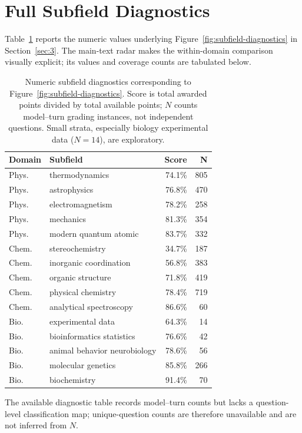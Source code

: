 \documentclass[11pt]{article}
\begin{document}
\section{Full Subfield Diagnostics}
\label{app:subfield_table}
Table~\ref{tab:subfield-diagnostics-full} reports the numeric values underlying Figure~\ref{fig:subfield-diagnostics} in Section~\ref{sec:3}.
The main-text radar makes the within-domain comparison visually explicit; its values and coverage counts are tabulated below.

\begin{table}[h]
\centering
\small
\setlength{\tabcolsep}{3.5pt}
\begin{tabular}{llrr}
\toprule
\textbf{Domain} & \textbf{Subfield} & \textbf{Score} & \textbf{N} \\
\midrule
Phys. & thermodynamics & 74.1\% & 805 \\
Phys. & astrophysics & 76.8\% & 470 \\
Phys. & electromagnetism & 78.2\% & 258 \\
Phys. & mechanics & 81.3\% & 354 \\
Phys. & modern quantum atomic & 83.7\% & 332 \\
Chem. & stereochemistry & 34.7\% & 187 \\
Chem. & inorganic coordination & 56.8\% & 383 \\
Chem. & organic structure & 71.8\% & 419 \\
Chem. & physical chemistry & 78.4\% & 719 \\
Chem. & analytical spectroscopy & 86.6\% & 60 \\
Bio. & experimental data & 64.3\% & 14 \\
Bio. & bioinformatics statistics & 76.6\% & 42 \\
Bio. & animal behavior neurobiology & 78.6\% & 56 \\
Bio. & molecular genetics & 85.8\% & 266 \\
Bio. & biochemistry & 91.4\% & 70 \\
\bottomrule
\end{tabular}
\caption{Numeric subfield diagnostics corresponding to Figure~\ref{fig:subfield-diagnostics}. Score is total awarded points divided by total available points; $N$ counts model--turn grading instances, not independent questions. Small strata, especially biology experimental data ($N=14$), are exploratory.}
\label{tab:subfield-diagnostics-full}
\end{table}

The available diagnostic table records model--turn counts but lacks a question-level classification map; unique-question counts are therefore unavailable and are not inferred from $N$.
\end{document}
